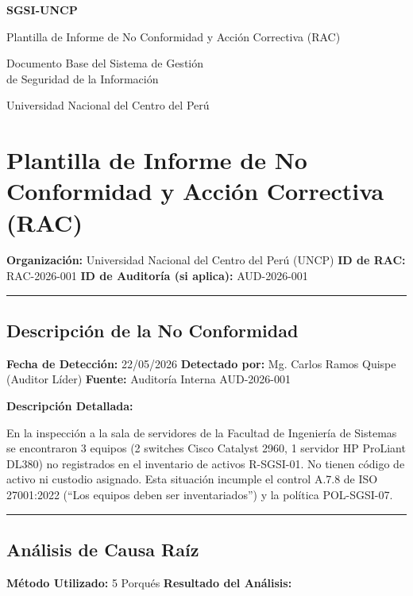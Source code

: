 \documentclass[10pt,letterpaper]{article}
\newcommand{\makecover}{
\begin{titlepage}
\centering
\vspace*{2cm}
{\Huge\bfseries\color{uncpblue} SGSI-UNCP\par}
\vspace{0.7cm}
{\LARGE Plantilla de Informe de No Conformidad y Acción Correctiva
(RAC)\par}
\vspace{0.5cm}
{\large Documento Base del Sistema de Gestión\\de Seguridad de la Información\par}
\vspace{1.5cm}
{\small Universidad Nacional del Centro del Perú\par}
\vfill
\end{titlepage}
}
\begin{document}
\makecover
\setcounter{tocdepth}{2}
\RaggedRight
\tableofcontents
\newpage

\RaggedRight
\section{Plantilla de Informe de No Conformidad y Acción Correctiva
(RAC)}\label{plantilla-de-informe-de-no-conformidad-y-acciuxf3n-correctiva-rac}

\textbf{Organización:} Universidad Nacional del Centro del Perú (UNCP)
\textbf{ID de RAC:} RAC-2026-001 \textbf{ID de Auditoría (si aplica):}
AUD-2026-001

\begin{center}\rule{0.5\linewidth}{0.5pt}\end{center}

\subsection{Descripción de la No
Conformidad}\label{descripciuxf3n-de-la-no-conformidad}

\textbf{Fecha de Detección:} 22/05/2026 \textbf{Detectado por:} Mg.
Carlos Ramos Quispe (Auditor Líder) \textbf{Fuente:} Auditoría Interna
AUD-2026-001

\textbf{Descripción Detallada:}

En la inspección a la sala de servidores de la Facultad de Ingeniería de
Sistemas se encontraron 3 equipos (2 switches Cisco Catalyst 2960, 1
servidor HP ProLiant DL380) no registrados en el inventario de activos
R-SGSI-01. No tienen código de activo ni custodio asignado. Esta
situación incumple el control A.7.8 de ISO 27001:2022 (``Los equipos
deben ser inventariados'') y la política POL-SGSI-07.

\begin{center}\rule{0.5\linewidth}{0.5pt}\end{center}

\subsection{Análisis de Causa Raíz}\label{anuxe1lisis-de-causa-rauxedz}

\textbf{Método Utilizado:} 5 Porqués \textbf{Resultado del Análisis:}
\end{document}
